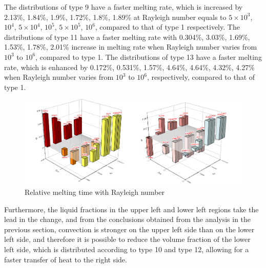 \documentclass[preprint,12pt]{elsarticle}
\begin{document}
The distributions of type 9 have a faster melting rate, which is increased by 2.13\%, 1.84\%, 1.9\%, 1.72\%, 1.8\%, 1.89\% at Rayleigh number equals to $ 5\times10^3 $, $ 10^4 $, $ 5\times10^4 $, $ 10^5 $, $ 5\times10^5 $, $ 10^6 $, compared to that of type 1 respectively. The distributions of type 11 have a faster melting rate with 0.304\%, 3.03\%, 1.69\%, 1.53\%, 1.78\%, 2.01\% increase in melting rate when Rayleigh number varies from $ 10^3 $ to $ 10^6 $, compared to type 1. The distributions of type 13 have a faster melting rate, which is enhanced by 0.172\%, 0.531\%, 1.57\%, 4.64\%, 4.64\%, 4.32\%, 4.27\% when Rayleigh number varies from $ 10^3 $ to $ 10^6 $, respectively, compared to that of type 1. 
\begin{figure}[H]
	\centering
	\includegraphics[scale=0.7]{Fig/3d.png}
	\caption{Relative melting time with Rayleigh number  }  
	\label{Fig_Ra} 
\end{figure}
Furthermore, the liquid fractions in the upper left and lower left regions take the lead in the change, and from the conclusions obtained from the analysis in the previous section, convection is stronger on the upper left side than on the lower left side, and therefore it is possible to reduce the volume fraction of the lower left side, which is distributed according to type 10 and type 12, allowing for a faster transfer of heat to the right side. 
\end{document}
